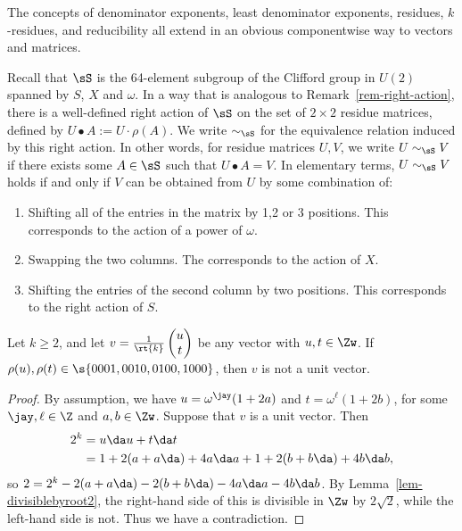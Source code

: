 \documentclass{article}
\begin{document}
The concepts of denominator exponents, least denominator exponents,
residues, $k$-residues, and reducibility all extend in an obvious
componentwise way to vectors and matrices.

\begin{definition}
  Recall that $\sS$ is the 64-element subgroup of the Clifford group
  in $U(2)$ spanned by $S$, $X$ and $\omega$. In a way that is
  analogous to Remark~\ref{rem-right-action}, there is a well-defined
  right action of $\sS$ on the set of $2\times 2$ residue matrices,
  defined by $U\bullet A := U\cdot \rho(A)$. We write $\sim_{\sS}$ for
  the equivalence relation induced by this right action. In other
  words, for residue matrices $U,V$, we write $U\sim_{\sS}V$ if there
  exists some $A\in\sS$ such that $U\bullet A=V$. In elementary terms,
  $U\sim_{\sS}V$ holds if and only if $V$ can be obtained from $U$ by
  some combination of:
  \begin{enumerate}
  \item Shifting all of the entries in the matrix by 1,2 or 3
    positions.  This corresponds to the action of a power of $\omega$.
    \item Swapping the two columns. The corresponds to the action of $X$.
    \item Shifting the entries of the second column by two
      positions. This corresponds to the right action of $S$.
  \end{enumerate}
\end{definition}

\begin{lemma}\label{lem-columncannotbe1s}
  Let $k\geq 2$, and let
  $v=\frac{1}{\rt{k}}\begin{pmatrix}u\\t\end{pmatrix}$ be any vector with
  $u,t\in\Zw$. If $\rho(u),\rho(t)\in\s{0001,0010,0100,1000}$, then
  $v$ is not a unit vector.
\end{lemma}

\begin{proof}
  By assumption, we have $u=\omega^\jay(1+2a)$ and
  $t=\omega^\ell(1+2b)$, for some $\jay,\ell\in\Z$ and $a,b\in\Zw$.
  Suppose that $v$ is a unit vector. Then
  \begin{align*}
    2^k &= u\da u + t\da t  \\
        &= 1+2(a+a\da) +4a\da a + 1+2(b+b\da) +4b\da b,
  \end{align*}
  so $2 = 2^k - 2(a+a\da) - 2(b+b\da) - 4a\da a -4b\da b$. By
  Lemma~\ref{lem-divisiblebyroot2}, the right-hand side of this is
  divisible in $\Zw$ by $2 \sqrt{2}$, while the left-hand side is
  not. Thus we have a contradiction.
\end{proof}
\end{document}
